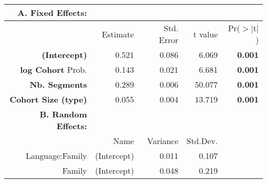 \begin{tabular}{rrrrr}
 {\bf A. Fixed Effects:} \\
\hline
 & Estimate & Std. Error & t value & Pr($>$$|$t$|$) \\ 
  \hline
{\bf (Intercept)} & 0.521 & 0.086 & 6.069 & {\bf 0.001} \\ 
  {\bf log Cohort} Prob. & 0.143 & 0.021 & 6.681 & {\bf 0.001} \\ 
  {\bf Nb. Segments} & 0.289 & 0.006 & 50.077 & {\bf 0.001} \\ 
  {\bf Cohort Size (type)} & 0.055 & 0.004 & 13.719 & {\bf 0.001} \\ 

\hline \hline
{\bf B. Random Effects:} \\
\hline
& Name & Variance & Std.Dev. \\
\hline
Language:Family & (Intercept) & 0.011 & 0.107 \\
Family & (Intercept) & 0.048 & 0.219 \\
\end{tabular}
